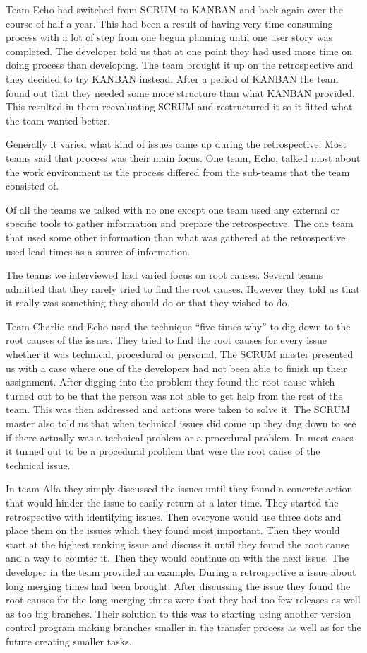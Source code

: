 Team Echo had switched from SCRUM to KANBAN and back again over the course of half a year. This had been a result of having very time consuming process with a lot of step from one begun planning until one user story was completed. The developer told us that at one point they had used more time on doing process than developing. The team brought it up on the retrospective and they decided to try KANBAN instead. After a period of KANBAN the team found out that they needed some more structure than what KANBAN provided. This resulted in them reevaluating SCRUM and restructured it so it fitted what the team wanted better. 

Generally it varied what kind of issues came up during the retrospective. Most teams said that process was their main focus. One team, Echo, talked most about the work environment as the process differed from the sub-teams that the team consisted of. 

\label{question-12}
Of all the teams we talked with no one except one team used any external or specific tools to gather information and prepare the retrospective. The one team that used some other information than what was gathered at the retrospective used lead times as a source of information. 

\label{question-13} 
The teams we interviewed had varied focus on root causes. Several teams admitted that they rarely tried to find the root causes. However they told us that it really was something they should do or that they wished to do. 

Team Charlie and Echo used the technique ``five times why'' to dig down to the root causes of the issues. They tried to find the root causes for every issue whether it was technical, procedural or personal. The SCRUM master presented us with a case where one of the developers had not been able to finish up their assignment. After digging into the problem they found the root cause which turned out to be that the person was not able to get help from the rest of the team. This was then addressed and actions were taken to solve it. The SCRUM master also told us that when technical issues did come up they dug down to see if there actually was a technical problem or a procedural problem. In most cases it turned out to be a procedural problem that were the root cause of the technical issue.

In team Alfa they simply discussed the issues until they found a concrete action that would hinder the issue to easily return at a later time. They started the retrospective with identifying issues. Then everyone would use three dots and place them on the issues which they found most important. Then they would start at the highest ranking issue and discuss it until they found the root cause and a way to counter it. Then they would continue on with the next issue. The developer in the team provided an example. During a retrospective a issue about long merging times had been brought. After discussing the issue they found the root-causes for the long merging times were that they had too few releases as well as too big branches. Their solution to this was to starting using another version control program making branches smaller in the transfer process as well as for the future creating smaller tasks. 

